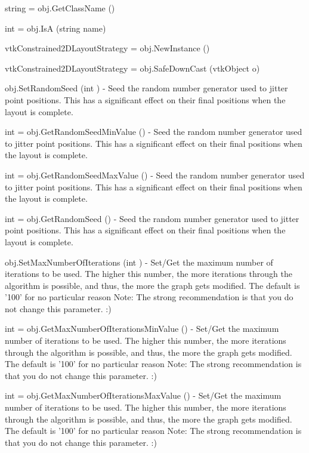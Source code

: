 \begin{DoxyItemize}
\item {\ttfamily string = obj.\-Get\-Class\-Name ()}  
\item {\ttfamily int = obj.\-Is\-A (string name)}  
\item {\ttfamily vtk\-Constrained2\-D\-Layout\-Strategy = obj.\-New\-Instance ()}  
\item {\ttfamily vtk\-Constrained2\-D\-Layout\-Strategy = obj.\-Safe\-Down\-Cast (vtk\-Object o)}  
\item {\ttfamily obj.\-Set\-Random\-Seed (int )} -\/ Seed the random number generator used to jitter point positions. This has a significant effect on their final positions when the layout is complete.  
\item {\ttfamily int = obj.\-Get\-Random\-Seed\-Min\-Value ()} -\/ Seed the random number generator used to jitter point positions. This has a significant effect on their final positions when the layout is complete.  
\item {\ttfamily int = obj.\-Get\-Random\-Seed\-Max\-Value ()} -\/ Seed the random number generator used to jitter point positions. This has a significant effect on their final positions when the layout is complete.  
\item {\ttfamily int = obj.\-Get\-Random\-Seed ()} -\/ Seed the random number generator used to jitter point positions. This has a significant effect on their final positions when the layout is complete.  
\item {\ttfamily obj.\-Set\-Max\-Number\-Of\-Iterations (int )} -\/ Set/\-Get the maximum number of iterations to be used. The higher this number, the more iterations through the algorithm is possible, and thus, the more the graph gets modified. The default is '100' for no particular reason Note\-: The strong recommendation is that you do not change this parameter. \-:)  
\item {\ttfamily int = obj.\-Get\-Max\-Number\-Of\-Iterations\-Min\-Value ()} -\/ Set/\-Get the maximum number of iterations to be used. The higher this number, the more iterations through the algorithm is possible, and thus, the more the graph gets modified. The default is '100' for no particular reason Note\-: The strong recommendation is that you do not change this parameter. \-:)  
\item {\ttfamily int = obj.\-Get\-Max\-Number\-Of\-Iterations\-Max\-Value ()} -\/ Set/\-Get the maximum number of iterations to be used. The higher this number, the more iterations through the algorithm is possible, and thus, the more the graph gets modified. The default is '100' for no particular reason Note\-: The strong recommendation is that you do not change this parameter. \-:)  

\end{DoxyItemize}
